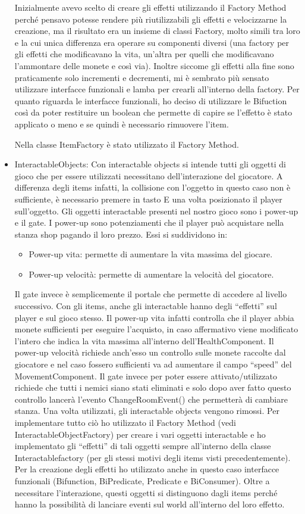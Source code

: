 \documentclass[a4paper,12pt]{report}
\begin{document}
\begin{itemize}
	Inizialmente avevo scelto di creare gli effetti utilizzando il Factory Method perché pensavo potesse rendere più riutilizzabili gli effetti e velocizzarne la creazione, ma il risultato era un insieme di classi Factory, molto simili tra loro e la cui unica differenza era operare su componenti diversi (una factory per gli effetti che modificavano la vita, un'altra per quelli che modificavano l'ammontare delle monete e così via).
	Inoltre siccome gli effetti alla fine sono praticamente solo incrementi e decrementi, mi è sembrato più sensato utilizzare interfacce funzionali e lamba per crearli all'interno della factory. 
	Per quanto riguarda le interfacce funzionali, ho deciso di utilizzare le Bifuction così da poter restituire un boolean che permette di capire se l'effetto è stato applicato o meno e se quindi è necessario rimuovere l'item.

	Nella classe ItemFactory è stato utilizzato il Factory Method.
	\item InteractableObjects: Con interactable objects si intende tutti gli oggetti di gioco che per essere utilizzati necessitano dell'interazione del giocatore. A differenza degli items infatti, la collisione con l'oggetto in questo caso non è sufficiente, è necessario premere in tasto E una volta posizionato il player sull'oggetto.
	Gli oggetti interactable presenti nel nostro gioco sono i power-up e il gate. 
	I power-up sono potenziamenti che il player può acquistare nella stanza shop pagando il loro prezzo. Essi si suddividono in:
	\begin{itemize} 
		\item Power-up vita: permette di aumentare la vita massima del giocare.
		\item Power-up velocità: permette di aumentare la velocità del giocatore.
	\end{itemize}
	Il gate invece è semplicemente il portale che permette di accedere al livello successivo. 
	Con gli items, anche gli interactable hanno degli “effetti” sul player e sul gioco stesso. 
	Il power-up vita infatti controlla che il player abbia monete sufficienti per eseguire l'acquisto, in caso affermativo viene modificato l'intero che indica la vita massima all'interno dell'HealthComponent.
	Il power-up velocità richiede anch'esso un controllo sulle monete raccolte dal giocatore e nel caso fossero sufficienti va ad aumentare il campo “speed” del MovementComponent.
	Il gate invece per poter essere attivato/utilizzato richiede che tutti i nemici siano stati eliminati e solo dopo aver fatto questo controllo lancerà l'evento ChangeRoomEvent() che permetterà di cambiare stanza.
	Una volta utilizzati, gli interactable objects vengono rimossi. 
	Per implementare tutto ciò ho utilizzato il Factory Method (vedi InteractableObjectFactory) per creare i vari oggetti interactable e ho implementato gli “effetti” di tali oggetti sempre all'interno della classe Interactablefactory (per gli stessi motivi degli items visti precedentemente). Per la creazione degli effetti ho utilizzato anche in questo caso interfacce funzionali (Bifunction, BiPredicate, Predicate e BiConsumer). 
	Oltre a necessitare l'interazione, questi oggetti si distinguono dagli items perché hanno la possibilità di lanciare eventi sul world all'interno del loro effetto.
	

\end{itemize}
\end{document}
